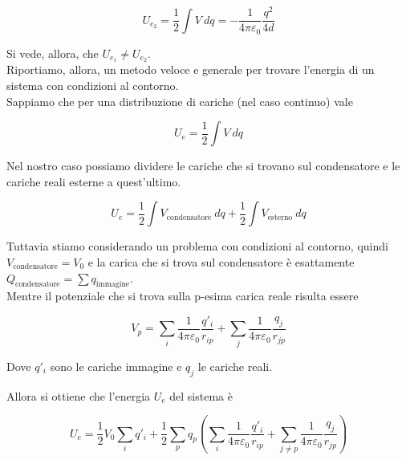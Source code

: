 \begin{equation*}
    U_{e_2} = \frac{1}{2} \int V \ dq = - \frac{1}{4 \pi \varepsilon_0} \frac{q^2}{4d}
\end{equation*}

Si vede, allora, che $U_{e_1} \neq U_{e_2}$. \\

Riportiamo, allora, un metodo veloce e generale per trovare l'energia di un sistema con condizioni al contorno. \\

Sappiamo che per una distribuzione di cariche (nel caso continuo) vale 

\begin{equation*}
    U_e = \frac{1}{2} \int V \ dq
\end{equation*}

Nel nostro caso possiamo dividere le cariche che si trovano sul condensatore e le cariche reali esterne a quest'ultimo. 

\begin{equation*}
    U_e = \frac{1}{2} \int V_{\text{condensatore}} \ dq + \frac{1}{2} \int V_{\text{esterno}} \ dq
\end{equation*}

Tuttavia stiamo considerando un problema con condizioni al contorno, quindi $V_{\text{condensatore}} = V_0$ e la carica che si trova sul condensatore è esattamente $Q_{\text{condensatore}} = \sum q_{\text{immagine}}$. \\ Mentre il potenziale che si trova sulla p-esima carica reale risulta essere 

\begin{equation*}
    V_p = \sum _i \frac{1}{4\pi \varepsilon_0} \frac{q'_i}{r_{ip}} + \sum_j \frac{1}{4 \pi \varepsilon_0} \frac{q_j}{r_{jp}}
\end{equation*}

Dove $q'_i$ sono le cariche immagine e $q_j$ le cariche reali. 

Allora si ottiene che l'energia $U_e$ del sistema è  

\begin{tcolorbox}[colback=yellow!10!white, colframe=orange!70!black, boxrule=0.8pt]
\begin{equation}
    U_e = \frac{1}{2} V_0 \sum_i q'_i + \frac{1}{2} \sum_p q_p \left( \sum _i \frac{1}{4\pi \varepsilon_0} \frac{q'_i}{r_{ip}} + \sum_{j \neq p} \frac{1}{4 \pi \varepsilon_0} \frac{q_j}{r_{jp}}   \right)
\end{equation}
\end{tcolorbox}

